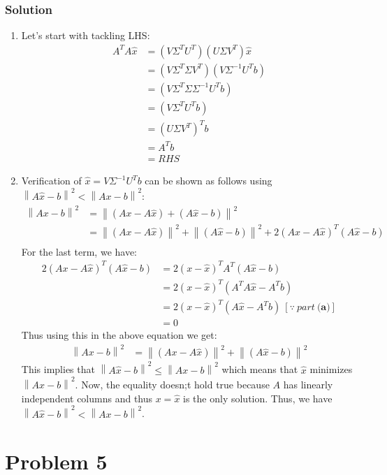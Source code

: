 \documentclass{article}
\newcommand{\norm}[1]{\left\lVert#1\right\rVert}
\begin{document}
\subsubsection*{Solution}
\begin{enumerate}[label=\alph*]
    \item Let's start with tackling LHS:
    \begin{align*}
        A^TA\hat{x} & = (V\Sigma^TU^T)(U\Sigma V^T)\hat{x}\\
        &= (V\Sigma^T\Sigma V^T)(V \Sigma^{-1}U^Tb)\\
        &= (V\Sigma^T\Sigma\Sigma^{-1}U^Tb)\\
        &= (V\Sigma^TU^Tb)\\
        &= (U\Sigma V^T)^Tb\\
        &= A^Tb\\
        &= RHS
    \end{align*}
    \item Verification of $\hat{x}=V\Sigma^{-1}U^Tb$ can be shown as follows using $\norm{A\hat{x}-b}^2 < \norm{Ax-b}^2$:
    \begin{align*}
        \norm{Ax-b}^2 &= \norm{(Ax-A\hat{x}) + (A\hat{x}-b)}^2\\
        & = \norm{(Ax-A\hat{x})}^2 + \norm{(A\hat{x}-b)}^2 + 2(Ax-A\hat{x})^T(A\hat{x}-b)\\
    \end{align*}
    For the last term, we have:
    \begin{align*}
        2(Ax-A\hat{x})^T(A\hat{x}-b) &= 2(x-\hat{x})^TA^T(A\hat{x}-b)\\
        &= 2(x-\hat{x})^T(A^TA\hat{x}-A^Tb)\\
        &= 2(x-\hat{x})^T(A\hat{x}-A^Tb)\ [\because\ part\ \textbf{(a)}]\\
        &= 0
    \end{align*}
    Thus using this in the above equation we get:
    \begin{align*}
        \norm{Ax-b}^2 &= \norm{(Ax-A\hat{x})}^2 + \norm{(A\hat{x}-b)}^2
    \end{align*}
    This implies that $\norm{A\hat{x}-b}^2 \leq \norm{Ax-b}^2$ which means that $\hat{x}$ minimizes $\norm{Ax-b}^2$. Now, the equality doesn;t hold true because $A$ has linearly independent columns and thus $x=\hat{x}$ is the only solution. Thus, we have $\norm{A\hat{x}-b}^2 < \norm{Ax-b}^2$.
\end{enumerate}
\section*{Problem 5}
\end{document}
